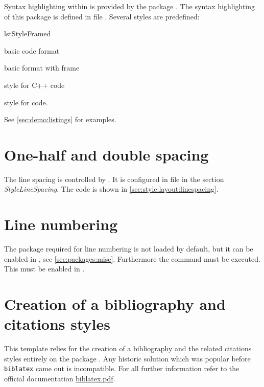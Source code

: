 Syntax highlighting within \latex is provided by the package . The syntax highlighting of this package is defined in file .
Several styles are predefined:
\begin{labeling}{\ttfamily lstStyleFramed}
\item[\ttfamily lstStyleBase] basic code format
\item[\ttfamily lstStyleFramed] basic format with frame
\item[\ttfamily lstStyleCpp] style for C++ code
\item[\ttfamily lstStyleLaTeX] style for \latex code.
\end{labeling}
See \cref{sec:demo:listings} for examples.

\section{One-half and double spacing}
\label{sec:doc:faq:spacing}

The line spacing is controlled by . It is configured in file  in the section \emph{StyleLineSpacing}. The code is shown in \cref{sec:style:layout:linespacing}.

\section{Line numbering}
\label{sec:doc:faq:linenumbering}

The package required for line numbering is not loaded by default, but it can be enabled in , see \cref{sec:packages:misc}. Furthermore the command  must be executed. This must be enabled in .

\section{Creation of a bibliography and citations styles}
\label{sec:doc:faq:biblatex}

This template relies for the creation of a bibliography and the related citations styles entirely on the package . Any historic solution which was popular before \texttt{biblatex} came out is incompatible.
For all further information refer to the official documentation \href{http://mirrors.ctan.org/macros/latex/contrib/biblatex/doc/biblatex.pdf}{biblatex.pdf}.

